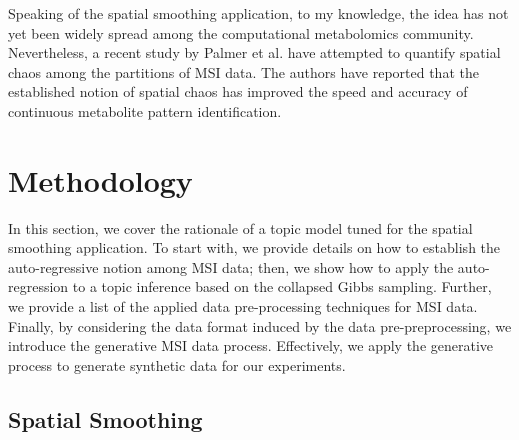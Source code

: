\documentclass{mpaper}
\begin{document}
\par Speaking of the spatial smoothing application, to my knowledge, the idea has not yet been widely spread among the computational metabolomics community. Nevertheless, a recent study by Palmer et al. \cite{palmer2016fdr} have attempted to quantify spatial chaos among the partitions of MSI data. The authors have reported that the established notion of spatial chaos has improved the speed and accuracy of continuous metabolite pattern identification. 


\section{Methodology}

\par In this section, we cover the rationale of a topic model tuned for the spatial smoothing application. To start with, we provide details on how to establish the auto-regressive notion among MSI data; then, we show how to apply the auto-regression to a topic inference based on the collapsed Gibbs sampling. Further, we provide a list of the applied data pre-processing techniques for MSI data. Finally, by considering the data format induced by the data pre-preprocessing, we introduce the generative MSI data process. Effectively, we apply the generative process to generate synthetic data for our experiments.

\subsection{Spatial Smoothing}
\end{document}
